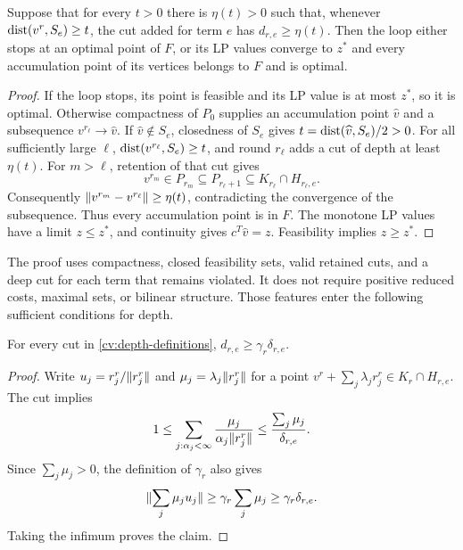 \begin{theorem}\label{cv:uniform-depth}
Suppose that for every $t>0$ there is $\eta(t)>0$ such that, whenever
$\operatorname{dist}(v^r,S_e)\ge t$, the cut added for term $e$ has
$d_{r,e}\ge\eta(t)$. Then the loop either stops at an optimal point of $F$,
or its LP values converge to $z^*$ and every accumulation point of its
vertices belongs to $F$ and is optimal.
\end{theorem}

\begin{proof}
If the loop stops, its point is feasible and its LP value is at most $z^*$,
so it is optimal. Otherwise compactness of $P_0$ supplies an accumulation
point $\widehat v$ and a subsequence $v^{r_\ell}\to\widehat v$. If
$\widehat v\notin S_e$, closedness of $S_e$ gives
$t=\operatorname{dist}(\widehat v,S_e)/2>0$. For all sufficiently large $\ell$,
$\operatorname{dist}(v^{r_\ell},S_e)\ge t$, and round $r_\ell$ adds a cut of depth at
least $\eta(t)$. For $m>\ell$, retention of that cut gives
\[
 v^{r_m}\in P_{r_m}\subseteq P_{r_\ell+1}
       \subseteq K_{r_\ell}\cap H_{r_\ell,e}.
\]
Consequently $\lVert v^{r_m}-v^{r_\ell}\rVert\ge\eta(t)$, contradicting the
convergence of the subsequence. Thus every accumulation point is in $F$.
The monotone LP values have a limit $z\le z^*$, and continuity gives
$c^T\widehat v=z$. Feasibility implies $z\ge z^*$.
\end{proof}

The proof uses compactness, closed feasibility sets, valid retained cuts,
and a deep cut for each term that remains violated. It does not require
positive reduced costs, maximal sets, or bilinear structure. Those features
enter the following sufficient conditions for depth.

\begin{lemma}\label{cv:cone-depth}
For every cut in \cref{cv:depth-definitions},
$d_{r,e}\ge\gamma_r\delta_{r,e}$.
\end{lemma}

\begin{proof}
Write $u_j=r_j^r/\lVert r_j^r\rVert$ and
$\mu_j=\lambda_j\lVert r_j^r\rVert$ for a point
$v^r+\sum_j\lambda_jr_j^r\in K_r\cap H_{r,e}$. The cut implies
\[
 1\le\sum_{j:\alpha_j<\infty}
             \frac{\mu_j}{\alpha_j\lVert r_j^r\rVert}
       \le\frac{\sum_j\mu_j}{\delta_{r,e}}.
\]
Since $\sum_j\mu_j>0$, the definition of $\gamma_r$ also gives
\[
 \lVert\sum_j\mu_ju_j\rVert
 \ge\gamma_r\sum_j\mu_j\ge\gamma_r\delta_{r,e}.
\]
Taking the infimum proves the claim.
\end{proof}

